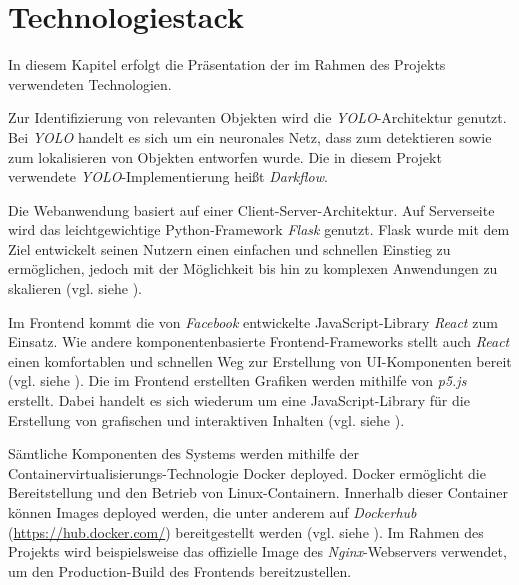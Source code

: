 \section{Technologiestack}

In diesem Kapitel erfolgt die Präsentation der im Rahmen des Projekts verwendeten Technologien.

Zur Identifizierung von relevanten Objekten wird die \textit{YOLO}-Architektur genutzt.
Bei \textit{YOLO} handelt es sich um ein neuronales Netz, dass zum detektieren sowie zum lokalisieren von Objekten entworfen wurde.
Die in diesem Projekt verwendete \textit{YOLO}-Implementierung heißt \textit{Darkflow}. 

Die Webanwendung basiert auf einer Client-Server-Architektur.
Auf Serverseite wird das leichtgewichtige Python-Framework \textit{Flask} genutzt.
Flask wurde mit dem Ziel entwickelt seinen Nutzern einen einfachen und schnellen Einstieg zu ermöglichen, 
jedoch mit der Möglichkeit bis hin zu komplexen Anwendungen zu skalieren (vgl. siehe \cite{palletsprojects}). 

Im Frontend kommt die von \textit{Facebook} entwickelte JavaScript-Library \textit{React} zum Einsatz.
Wie andere komponentenbasierte Frontend-Frameworks stellt auch \textit{React} einen komfortablen und schnellen 
Weg zur Erstellung von UI-Komponenten bereit (vgl. siehe \cite{react.js}). 
Die im Frontend erstellten Grafiken werden mithilfe von \textit{p5.js} erstellt.
Dabei handelt es sich wiederum um eine JavaScript-Library für die Erstellung von grafischen und interaktiven
Inhalten (vgl. siehe \cite{p5.js}). 

Sämtliche Komponenten des Systems werden mithilfe der Container\-virtualisierungs-Technologie Docker deployed.
Docker ermöglicht die Bereitstellung und den Betrieb von Linux-Containern.
Innerhalb dieser Container können Images deployed werden, die unter anderem auf \textit{Dockerhub} (\url{https://hub.docker.com/}) 
bereitgestellt werden (vgl. siehe \cite{redhat-docker}).
Im Rahmen des Projekts wird beispielsweise das offizielle Image des \textit{Nginx}-Webservers verwendet, um den 
Production-Build des Frontends bereitzustellen. 


